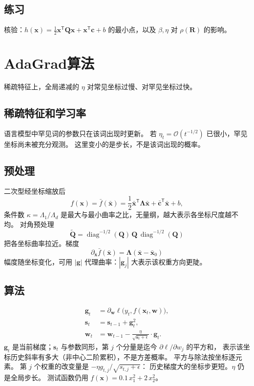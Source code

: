 \subsection{练习}

核验：$h(\bm{x})=\frac12\bm{x}^{\mathsf T}\bm{Q}\bm{x}+\bm{x}^{\mathsf T}\bm{c}+b$ 的最小点，以及 $\beta,\eta$ 对 $\rho(\bm{R})$ 的影响。

\section{AdaGrad算法}

稀疏特征上，全局递减的 $\eta$ 对常见坐标过慢、对罕见坐标过快。

\subsection{稀疏特征和学习率}

语言模型中罕见词的参数只在该词出现时更新。
若 $\eta_t=\mathcal{O}(t^{-1/2})$ 已很小，罕见坐标尚未被充分观测。
这里变小的是步长，不是该词出现的概率。

\subsection{预处理}

二次型经坐标缩放后
\[
f(\bm{x})=\bar f(\bar{\bm{x}})
=
\frac12\bar{\bm{x}}^{\mathsf T}\bm{\Lambda}\bar{\bm{x}}
+\bar{\bm{c}}^{\mathsf T}\bar{\bm{x}}+b,
\]
条件数 $\kappa=\Lambda_1/\Lambda_d$ 是最大与最小曲率之比，无量纲，越大表示各坐标尺度越不均。
对角预处理
\[
\tilde{\bm{Q}}
=
\operatorname{diag}^{-1/2}(\bm{Q})\,\bm{Q}\,\operatorname{diag}^{-1/2}(\bm{Q})
\]
把各坐标曲率拉近。梯度
\[
\partial_{\bar{\bm{x}}}\bar f(\bar{\bm{x}})
=
\bm{\Lambda}(\bar{\bm{x}}-\bar{\bm{x}}_0)
\]
幅度随坐标变化，可用 $|\bm{g}|$ 代理曲率：$|\bm{g}_j|$ 大表示该权重方向更陡。

\subsection{算法}

\begin{align*}
\bm{g}_t&=\partial_{\bm{w}}\ell\bigl(y_t,f(\bm{x}_t,\bm{w})\bigr),
\\
\bm{s}_t&=\bm{s}_{t-1}+\bm{g}_t^2,
\\
\bm{w}_t&=\bm{w}_{t-1}-\frac{\eta}{\sqrt{\bm{s}_t+\epsilon}}\cdot\bm{g}_t.
\end{align*}
$\bm{g}_t$ 是当前梯度；$\bm{s}_t$ 与参数同形，第 $j$ 个分量是迄今 $\partial\ell/\partial w_j$ 的平方和，
表示该坐标历史斜率有多大（非中心二阶累积），不是方差概率。
平方与除法按坐标逐元素。
第 $j$ 个权重的改变量是 $-\eta g_{t,j}/\sqrt{s_{t,j}+\epsilon}$：
历史梯度大的坐标步更短。$\eta$ 仍是全局步长。
测试函数仍用
$f(\bm{x})=0.1\,x_1^2+2\,x_2^2$。

